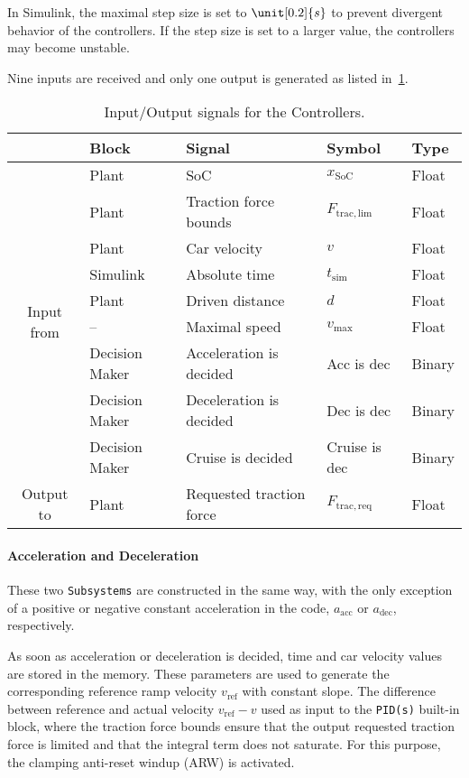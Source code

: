 In Simulink, the maximal step size is set to $\unit[0.2]{s}$ to prevent divergent behavior of the controllers. If the step size is set to a larger value, the controllers may become unstable.

Nine inputs are received and only one output is generated as listed in~\cref{tab:simInOutControllers}.
\begin{table}[htbp]
	\centering
	\caption{Input/Output signals for the Controllers.}
	\label{tab:simInOutControllers}
	
	\begin{tabular}{c l l l l}
		\toprule
		& Block & Signal & Symbol & Type \\ 
		\midrule
		\multirow{9}{*}{Input from}
		& Plant & SoC & $x_\mathrm{SoC}$ & Float \\
		& Plant & Traction force bounds & $F_\mathrm{trac,lim}$ & Float \\
		& Plant & Car velocity & $v$ & Float \\
		& Simulink & Absolute time & $t_\mathrm{sim}$ & Float \\
		& Plant & Driven distance & $d$ & Float \\
		& -- & Maximal speed & $v_\mathrm{max}$ & Float \\
		& Decision Maker & Acceleration is decided & Acc is dec & Binary \\
		& Decision Maker & Deceleration is decided & Dec is dec & Binary \\
		& Decision Maker & Cruise is decided & Cruise is dec & Binary \\
		\midrule
		\multirow{1}{*}{Output to}
		& Plant & Requested traction force & $F_\mathrm{trac,req}$ & Float \\
		\bottomrule
	\end{tabular}
\end{table}

\paragraph{Acceleration and Deceleration}
These two \texttt{Subsystems} are constructed in the same way, with the only exception of a positive or negative constant acceleration in the code, $a_\mathrm{acc}$ or $a_\mathrm{dec}$, respectively.

As soon as acceleration or deceleration is decided, time and car velocity values are stored in the memory. These parameters are used to generate the corresponding reference ramp velocity $v_\mathrm{ref}$ with constant slope. The difference between reference and actual velocity $v_\mathrm{ref} - v$ used as input to the \texttt{PID(s)} built-in block, where the traction force bounds ensure that the output requested traction force is limited and that the integral term does not saturate. For this purpose, the clamping anti-reset windup (ARW) is activated.

